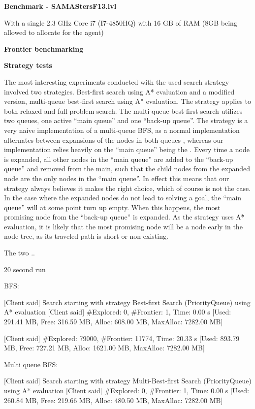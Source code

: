 \textbf{Benchmark - SAMAStersF13.lvl}


With a single 2.3 GHz Core i7 (I7-4850HQ) with 16 GB of RAM (8GB being allowed to allocate for the agent)


\textbf{Frontier benchmarking}




\textbf{Strategy tests}

The most interesting experiments conducted with the used search strategy involved two strategies. Best-first search using A* evaluation and a modified version, multi-queue best-first search using A\^{*} evaluation. The strategy applies to both relaxed and full problem search. 
The multi-queue best-first search utilizes two queues, one active ``main queue'' and one ``back-up queue''. The strategy is a very naive implementation of a multi-queue BFS, as a normal implementation alternates between expansions of the nodes in both queues \cite{hector2013a}, whereas our implementation relies heavily on the ``main queue'' being the . Every time a node is expanded, all other nodes in the ``main queue'' are added to the ``back-up queue'' and removed from the main, such that the child nodes from the expanded node are the only nodes in the ``main queue''. In effect this means that our strategy always believes it makes the right choice, which of course is not the case. In the case where the expanded nodes do not lead to solving a goal, the ``main queue'' will at some point turn up empty. When this happens, the most promising node from the ``back-up queue'' is expanded. As the strategy uses A\^{*} evaluation, it is likely that the most promising node will be a node early in the node tree, as its traveled path is short or non-existing. 


The two .. 



20 second run 

BFS:

[Client said] Search starting with strategy Best-first Search (PriorityQueue) using A* evaluation
[Client said] #Explored:    0, #Frontier:   1, Time: 0.00 s     [Used: 291.41 MB, Free: 316.59 MB, Alloc: 608.00 MB, MaxAlloc: 7282.00 MB]

[Client said] #Explored: 79000, #Frontier: 11774, Time: 20.33 s     [Used: 893.79 MB, Free: 727.21 MB, Alloc: 1621.00 MB, MaxAlloc: 7282.00 MB]


Multi queue BFS:

[Client said] Search starting with strategy Multi-Best-first Search (PriorityQueue) using A* evaluation
[Client said] #Explored:    0, #Frontier:   1, Time: 0.00 s     [Used: 260.84 MB, Free: 219.66 MB, Alloc: 480.50 MB, MaxAlloc: 7282.00 MB]

